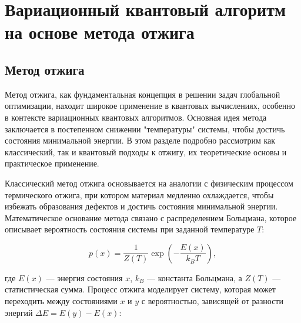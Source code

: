 \documentclass[a4paper]{report}
\begin{document}
\chapter{Вариационный квантовый алгоритм на основе метода отжига}


\section{Метод отжига}

Метод отжига, как фундаментальная концепция в решении задач глобальной оптимизации, находит широкое применение в квантовых вычислениях, особенно в контексте вариационных квантовых алгоритмов. Основная идея метода заключается в постепенном снижении "температуры" системы, чтобы достичь состояния минимальной энергии. В этом разделе подробно рассмотрим как классический, так и квантовый подходы к отжигу, их теоретические основы и практическое применение.

Классический метод отжига основывается на аналогии с физическим процессом термического отжига, при котором материал медленно охлаждается, чтобы избежать образования дефектов и достичь состояния минимальной энергии. Математическое основание метода связано с распределением Больцмана, которое описывает вероятность состояния системы при заданной температуре $T$:

\begin{equation}
p(x) = \frac{1}{Z(T)} \exp\left(-\frac{E(x)}{k_B T}\right),
\end{equation}

где $E(x)$ — энергия состояния $x$, $k_B$ — константа Больцмана, а $Z(T)$ — статистическая сумма. Процесс отжига моделирует систему, которая может переходить между состояниями $x$ и $y$ с вероятностью, зависящей от разности энергий $\Delta E = E(y) - E(x)$:
\end{document}
